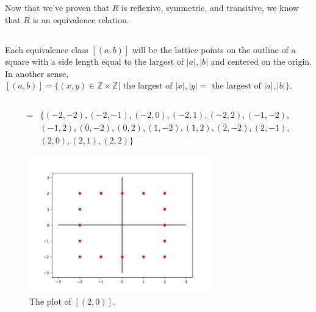 \documentclass{article}
\begin{document}
Now that we've proven that $R$ is reflexive, symmetric, and transitive, we know that $R$ is an equivalence relation.


\subsection{}
Each equivalence class $[(a,b)]$ will be the lattice points on the outline of a square with a side length equal to the largest of $|a|,|b|$ and centered on the origin.\\
In another sense, $[(a,b)] = \{ (x,y) \in \mathbb{Z} \times \mathbb{Z} | \text{ the largest of } |x|,|y| = \text{ the largest of } |a|,|b| \}$.

\subsection{}
\begin{align*}
    [2,0] = &\{(-2, -2), (-2, -1), (-2, 0), (-2, 1), (-2, 2), (-1, -2),\\
          &(-1, 2), (0, -2), (0, 2), (1, -2), (1, 2), (2, -2), (2, -1),\\
          &(2, 0), (2, 1), (2, 2)\}
\end{align*}
\begin{figure}[hbt!]
    \centering
    \includegraphics[width=0.7\textwidth]{plot.png}
    \caption{The plot of $[(2,0)]$.}
\end{figure}
\FloatBarrier

\section{}
\end{document}
